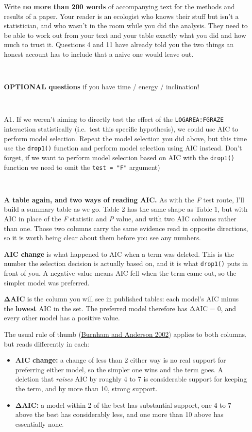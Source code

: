 \documentclass[
]{article}
\newcounter{none} %
\providecommand{\tightlist}{%
  \setlength{\itemsep}{0pt}\setlength{\parskip}{0pt}}
\begin{document}
Write \textbf{no more than 200 words} of accompanying text for the
methods and results of a paper. Your reader is an ecologist who knows
their stuff but isn't a statistician, and who wasn't in the room while
you did the analysis. They need to be able to work out from your text
and your table exactly what you did and how much to trust it. Questions
4 and 11 have already told you the two things an honest account has to
include that a naive one would leave out.

~

\textbf{OPTIONAL questions} if you have time / energy / inclination!

~

A1. If we weren't aiming to directly test the effect of the
\texttt{LOGAREA:FGRAZE} interaction statistically (i.e.~test this
specific hypothesis), we could use AIC to perform model selection.
Repeat the model selection you did above, but this time use the
\texttt{drop1()} function and perform model selection using AIC instead.
Don't forget, if we want to perform model selection based on AIC with
the \texttt{drop1()} function we need to omit the \texttt{test\ =\ "F"}
argument)

~

\textbf{A table again, and two ways of reading AIC.} As with the
\emph{F} test route, I'll build a summary table as we go. Table 2 has
the same shape as Table 1, but with AIC in place of the \emph{F}
statistic and \emph{P} value, and with two AIC columns rather than one.
Those two columns carry the same evidence read in opposite directions,
so it is worth being clear about them before you see any numbers.

\textbf{AIC change} is what happened to AIC when a term was deleted.
This is the number the selection decision is actually based on, and it
is what \texttt{drop1()} puts in front of you. A negative value means
AIC fell when the term came out, so the simpler model was preferred.

\textbf{ΔAIC} is the column you will see in published tables: each
model's AIC minus the \textbf{lowest} AIC in the set. The preferred
model therefore has ΔAIC = 0, and every other model has a positive
value.

The usual rule of thumb (\hyperref[refs]{Burnham and Anderson 2002})
applies to both columns, but reads differently in each:

\begin{itemize}
\tightlist
\item
  \textbf{AIC change:} a change of less than 2 either way is no real
  support for preferring either model, so the simpler one wins and the
  term goes. A deletion that \emph{raises} AIC by roughly 4 to 7 is
  considerable support for keeping the term, and by more than 10, strong
  support.
\item
  \textbf{ΔAIC:} a model within 2 of the best has substantial support,
  one 4 to 7 above the best has considerably less, and one more than 10
  above has essentially none.
\end{itemize}
\end{document}
